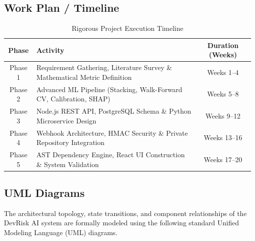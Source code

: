 \documentclass[12pt, a4paper]{article}
\begin{document}
\subsection{Work Plan / Timeline}
\begin{table}[h!]
\centering
\caption{Rigorous Project Execution Timeline}
\vspace{0.2cm}
\begin{tabular}{|c|p{8cm}|c|}
\hline
\textbf{Phase} & \textbf{Activity} & \textbf{Duration (Weeks)} \\ \hline
Phase 1 & Requirement Gathering, Literature Survey \& Mathematical Metric Definition & Weeks 1--4 \\ \hline
Phase 2 & Advanced ML Pipeline (Stacking, Walk-Forward CV, Calibration, SHAP) & Weeks 5--8 \\ \hline
Phase 3 & Node.js REST API, PostgreSQL Schema \& Python Microservice Design & Weeks 9--12 \\ \hline
Phase 4 & Webhook Architecture, HMAC Security \& Private Repository Integration & Weeks 13--16 \\ \hline
Phase 5 & AST Dependency Engine, React UI Construction \& System Validation & Weeks 17--20 \\ \hline
\end{tabular}
\end{table}

\clearpage
\subsection{UML Diagrams}
The architectural topology, state transitions, and component relationships of the DevRisk AI system are formally modeled using the following standard Unified Modeling Language (UML) diagrams.

\end{document}
